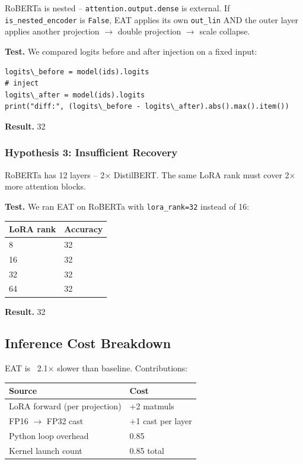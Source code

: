 RoBERTa is nested -- \texttt{attention.output.dense} is external. If 
\texttt{is\_nested\_encoder} is \texttt{False}, EAT applies its own \texttt{out\_lin} AND the 
outer layer applies another projection $\to$ double projection $\to$ scale collapse.

\textbf{Test.} We compared logits before and after injection on a fixed input:

\begin{lstlisting}
logits\_before = model(ids).logits
# inject
logits\_after = model(ids).logits
print("diff:", (logits\_before - logits\_after).abs().max().item())
\end{lstlisting}

\textbf{Result.} 32

\subsubsection{Hypothesis 3: Insufficient Recovery}

RoBERTa has 12 layers -- 2$\times$ DistilBERT. The same LoRA rank must cover 
2$\times$ more attention blocks.

\textbf{Test.} We ran EAT on RoBERTa with \texttt{lora\_rank=32} instead of 16:

\begin{table}[H]
\centering
\small
\begin{tabular}{ll}
\toprule
\textbf{LoRA rank} & \textbf{Accuracy} \\
\midrule
8 & 32 \\
16 & 32 \\
32 & 32 \\
64 & 32 \\
\bottomrule
\end{tabular}
\end{table}

\textbf{Result.} 32

\subsection{Inference Cost Breakdown}

EAT is ~2.1$\times$ slower than baseline. Contributions:

\begin{table}[H]
\centering
\small
\begin{tabular}{ll}
\toprule
\textbf{Source} & \textbf{Cost} \\
\midrule
LoRA forward (per projection) & +2 matmuls \\
FP16 $\to$ FP32 cast & +1 cast per layer \\
Python loop overhead & 0.85 \\
Kernel launch count & 0.85 total \\
\bottomrule
\end{tabular}
\end{table}

